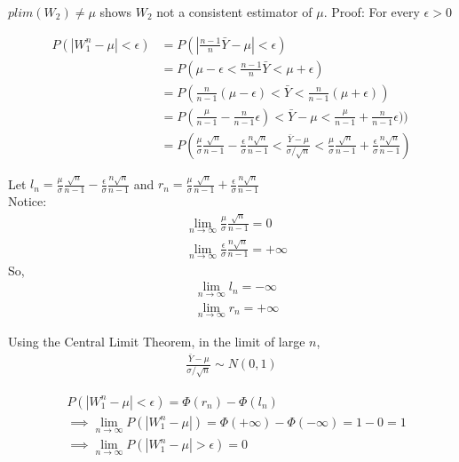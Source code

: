\begin{enumerate}
$plim(W_2) \neq \mu$ shows $W_2$ not a consistent estimator of $\mu$.\newline \newline \newline
\noindent Proof: For every $\epsilon > 0$


\begin{align*}
P(|W_1^n - \mu| < \epsilon) &= P(|\frac{n - 1}{n}\bar{Y}- \mu| < \epsilon)\\
    &= P(\mu - \epsilon < \frac{n - 1}{n}\bar{Y} < \mu + \epsilon)\\
    &= P(\frac{n}{n - 1}(\mu - \epsilon) < \bar{Y} < \frac{n}{n - 1}(\mu + \epsilon))\\
    &= P(\frac{\mu}{n - 1} - \frac{n}{n - 1} \epsilon) < \bar{Y} - \mu < \frac{\mu}{n - 1} + \frac{n}{n - 1} \epsilon))\\
     &= P(\frac{\mu}{\sigma}\frac{\sqrt{n}}{n - 1} - \frac{\epsilon}{\sigma}\frac{n\sqrt{n}}{n - 1}  < \frac{\bar{Y} - \mu}{\sigma / \sqrt{n}} < \frac{\mu}{\sigma}\frac{\sqrt{n}}{n - 1} + \frac{\epsilon}{\sigma}\frac{n\sqrt{n}}{n - 1} )
\end{align*}

Let $l_n = \frac{\mu}{\sigma}\frac{\sqrt{n}}{n - 1} - \frac{\epsilon}{\sigma}\frac{n\sqrt{n}}{n - 1}$ and $r_n = \frac{\mu}{\sigma}\frac{\sqrt{n}}{n - 1} + \frac{\epsilon}{\sigma}\frac{n\sqrt{n}}{n - 1}$\\
Notice:
\begin{align*}
&\lim_{n \to \infty}  \frac{\mu}{\sigma}\frac{\sqrt{n}}{n - 1} = 0\\
&\lim_{n \to \infty}  \frac{\epsilon}{\sigma}\frac{n\sqrt{n}}{n - 1} = +\infty
\end{align*}
So,
\begin{align*}
&\lim_{n \to \infty}  l_n = -\infty\\
&\lim_{n \to \infty}  r_n = +\infty
\end{align*}

Using the Central Limit Theorem, in the limit of large $n$, 
\begin{align*}
\frac{\bar{Y} - \mu}{\sigma / \sqrt{n}} \sim N(0,1)
\end{align*}

\begin{align*}
&P(|W_1^n - \mu| < \epsilon) = \Phi(r_n) - \Phi(l_n)\\
&\implies \lim_{n \to \infty} P(|W_1^n - \mu|) =  \Phi(+\infty) - \Phi(-\infty)
= 1 - 0 = 1\\
&\implies \lim_{n \to \infty} P(|W_1^n - \mu| > \epsilon) = 0 
\end{align*}


\end{enumerate}
